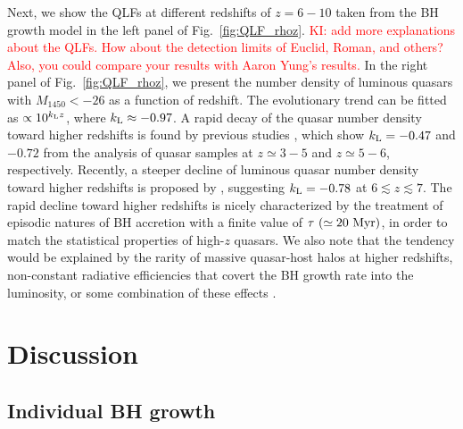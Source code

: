 \documentclass[twocolumn, twocolappendix]{aastex63}
\newcommand{\Muv}{M_{1450}}
\newcommand{\red}[1]{\textcolor{red}{ #1}}
\begin{document}
\begin{CJK*}{UTF8}{gbsn}
Next, we show the QLFs at different redshifts of $z=6-10$ taken from the BH growth model in the left panel of Fig.~\ref{fig:QLF_rhoz}.
\red{KI: add more explanations about the QLFs. How about the detection limits of Euclid, Roman, and others?
Also, you could compare your results with Aaron Yung's results.}
In the right panel of Fig.~\ref{fig:QLF_rhoz}, we present the number density of luminous quasars with $\Muv <-26$ as a function of redshift.
The evolutionary trend can be fitted as $\propto 10^{k_{\rm L}z}$, where $k_{\rm L}\approx -0.97$.
A rapid decay of the quasar number density toward higher redshifts is found by previous studies \citep[e.g.,][]{2001AJ....122.2833F,2016ApJ...833..222J},
which show $k_{\rm L}= -0.47$ and $-0.72$ from the analysis of quasar samples at $z\simeq 3-5$ and $z\simeq 5-6$, respectively.
Recently, a steeper decline of luminous quasar number density toward higher redshifts is proposed by \citet{2019ApJ...884...30W},
suggesting $k_{\rm L}=-0.78$ at $6\lesssim z \lesssim 7$.
The rapid decline toward higher redshifts is nicely characterized by the treatment of episodic natures of BH accretion with a finite value of
$\tau ~(\simeq 20~{\rm Myr})$, in order to match the statistical properties of high-$z$ quasars.
We also note that the tendency would be explained by the rarity of massive quasar-host halos at higher redshifts,
non-constant radiative efficiencies that covert the BH growth rate into the luminosity, or some combination of these effects
\citep[e.g.,][]{2010ApJ...718..231S}.

\section{Discussion}
\vspace{2mm}
\subsection{Individual BH growth}\label{sec:evol}


\end{CJK*}
\end{document}
